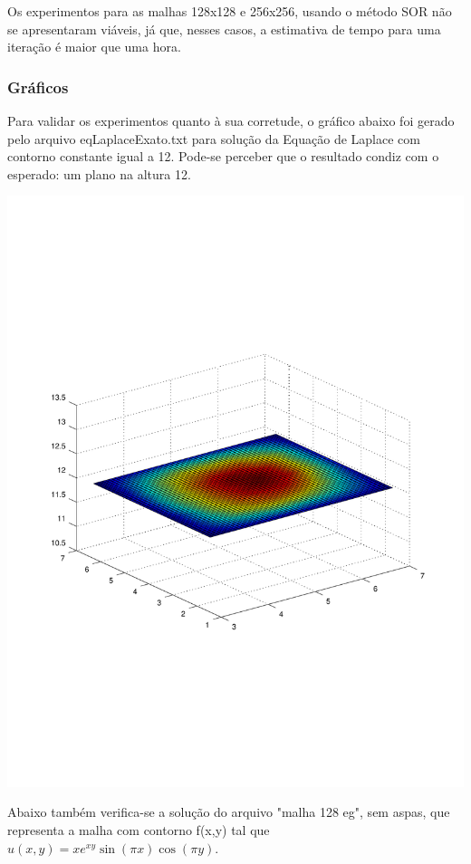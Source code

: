 \documentclass[
	article,			%
	11pt,				%
	oneside,			%
	a4paper,			%
	english,			%
	brazil,				%
	sumario=tradicional
	]{abntex2}
\begin{document}
Os experimentos para as malhas 128x128 e 256x256, usando o método SOR não se apresentaram viáveis, já que, nesses casos, a estimativa
de tempo para uma iteração é maior que uma hora.
 
\subsubsection{Gráficos}

Para validar os experimentos quanto à sua corretude, o gráfico abaixo foi gerado pelo arquivo eqLaplaceExato.txt para solução da Equação de Laplace com contorno constante igual a 12. Pode-se perceber que o resultado condiz com o esperado: um plano na altura 12.

\includegraphics[scale=0.5]{eqLaplaceExato}

Abaixo também verifica-se a solução do arquivo "malha 128 eg", sem aspas, que representa a malha com contorno f(x,y) tal que $u(x,y)=x e^{xy} \sin (\pi x) \cos (\pi y)$.
\end{document}
